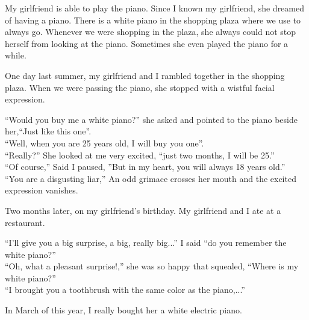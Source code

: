 \documentclass[12pt,a4paper]{caspset}
\begin{document}

My girlfriend is able to play the piano. Since I known my girlfriend, she dreamed of having a piano. There is a white piano in the shopping plaza where we use to always go. Whenever we were shopping in the plaza, she always could not stop herself from looking at the piano. Sometimes she even played the piano for a while.

One day last summer, my girlfriend and I rambled together in the shopping plaza. When we were passing the piano, she stopped with a wistful facial expression.

``Would you buy me a white piano?'' she asked and pointed to the piano beside her,``Just like this one''.\\
``Well, when you are 25 years old, I will buy you one''.\\
``Really?'' She looked at me very excited, ``just two months, I will be 25.''\\
``Of course,'' Said I paused, ''But in my heart, you will always 18 years old.''\\
``You are a disgusting liar,'' An odd grimace crosses her mouth and the excited expression vanishes.

Two months later, on my girlfriend’s birthday. My girlfriend and I ate at a restaurant.

``I'll give you a big surprise, a big, really big...'' I said ``do you remember the white piano?''\\
``Oh, what a pleasant surprise!,'' she was so happy that squealed, ``Where is my white piano?''\\
``I brought you a toothbrush with the same color as the piano,...''

In March of this year, I really bought her a white electric piano.
\end{document}
